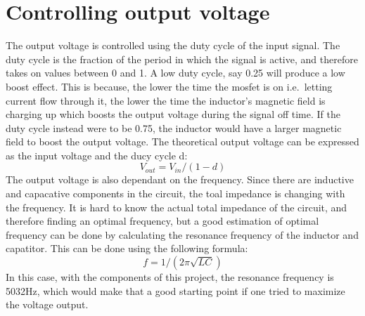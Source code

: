 \section{Controlling output voltage}
The output voltage is controlled using the duty cycle of the input signal. The duty cycle is the fraction of the period in which the signal is active, and therefore takes on values between 0 and 1. A low duty cycle, say 0.25 will produce a low boost effect. This is because, the lower the time the mosfet is on i.e.\ letting current flow through it, the lower the time the inductor's magnetic field is charging up which boosts the output voltage during the signal off time. If the duty cycle instead were to be 0.75, the inductor would have a larger magnetic field to boost the output voltage. The theoretical output voltage can be expressed as the input voltage and the ducy cycle d:
\begin{equation}
    V_{out}=V_{in}/(1-d)
\end{equation}
The output voltage is also dependant on the frequency. Since there are inductive and capacative components in the circuit, the toal impedance is changing with the frequency. It is hard to know the actual total impedance of the circuit, and therefore finding an optimal frequency, but a good estimation of optimal frequency can be done by calculating the resonance frequency of the inductor and capatitor. This can be done using the following formula:
\begin{equation}
    f=1/(2\pi{}\sqrt{LC})
\end{equation}
In this case, with the components of this project, the resonance frequency is 5032Hz, which would make that a good starting point if one tried to maximize the voltage output.
